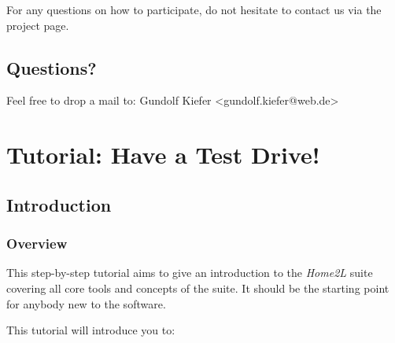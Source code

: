 \documentclass[12pt,english,parskip=half,headheight=19pt]{scrreprt}
\newcommand{\lstf}[1]{\colorbox{lstbackground}{\ttfamily\footnotesize#1}}
\begin{document}
For any questions on how to participate, do not hesitate to contact us
via the project page.



\section{Questions?}
\label{sec:support}


Feel free to drop a mail to: \lstf{Gundolf Kiefer <gundolf.kiefer@web.de>}





%
%
\chapter{Tutorial: Have a Test Drive!}
\label{ch:tutorial}
%
%





\section{Introduction}
\label{sec:tutorial-intro}


\subsection{Overview}

This step-by-step tutorial aims to give an introduction to the \textit{Home2L} suite covering all core tools and concepts of the suite. It should be the starting point for anybody new to the software.

This tutorial will introduce you to:
\end{document}

